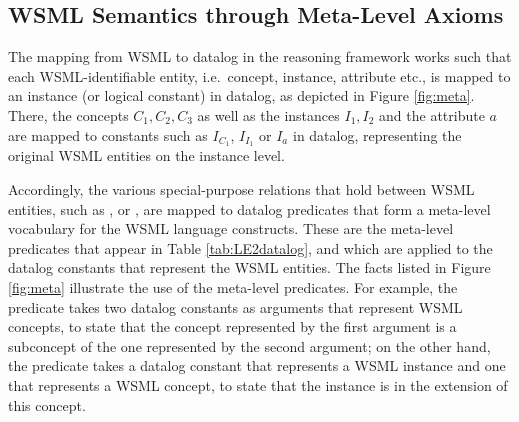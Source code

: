 \subsection{WSML Semantics through Meta-Level Axioms}

The mapping from WSML to datalog in the reasoning framework works
such that each WSML-identifiable entity, i.e.\ concept, instance,
attribute etc., is mapped to an instance (or logical constant) in
datalog, as depicted in Figure \ref{fig:meta}. There, the concepts
$C_1, C_2, C_3$ as well as the instances $I_1, I_2$ and the
attribute $a$ are mapped to constants such as $I_{C_1}$, $I_{I_1}$
or $I_a$ in datalog, representing the original WSML entities on
the instance level.

Accordingly, the various special-purpose relations that hold
between WSML entities, such as ,
 or , are mapped to datalog
predicates that form a meta-level vocabulary for the WSML language
constructs. These are the meta-level predicates that appear in
Table \ref{tab:LE2datalog}, and which are applied to the datalog
constants that represent the WSML entities. The facts listed in
Figure \ref{fig:meta} illustrate the use of the meta-level
predicates. For example, the predicate \psco takes two datalog
constants as arguments that represent WSML concepts, to state that
the concept represented by the first argument is a subconcept of
the one represented by the second argument; on the other hand, the
predicate \pmo takes a datalog constant that represents a WSML
instance and one that represents a WSML concept, to state that the
instance is in the extension of this concept.

